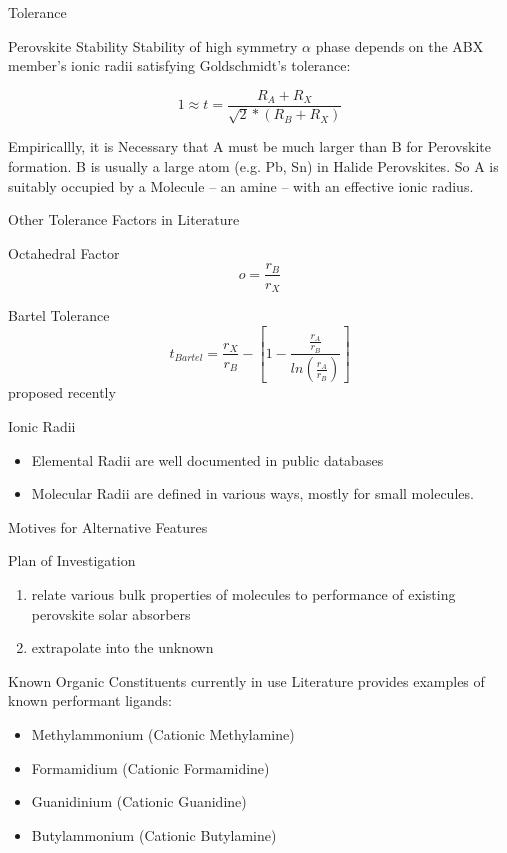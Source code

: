 \documentclass[10pt, aspectratio=169, presentation]{beamer}
\begin{document}
\begin{frame}[label={sec:orgb31e4ee}]{Tolerance}
\begin{block}{Perovskite Stability}
Stability of high symmetry \(\alpha\) phase depends on the ABX member's
ionic radii satisfying Goldschmidt's tolerance:
\autocite{yin-2015-halid-perov}

\[
1 \approx t = \frac{R_A+R_X}{\sqrt{2}*(R_B+R_X)}
\]

Empiricallly, it is \alert{Necessary} that A must be much larger than B
for Perovskite formation. B is usually a large atom (e.g. Pb, Sn) in
Halide Perovskites. So A is suitably occupied by a Molecule -- an
amine -- with an effective ionic radius.
\autocite{kieslich-2015-exten-toler}
\end{block}
\end{frame}
\begin{frame}[label={sec:orgd049ab4}]{Other Tolerance Factors in Literature}
\begin{block}{Octahedral Factor}
\[
o=\frac{r_B}{r_X}
\]
\end{block}
\begin{block}{Bartel Tolerance}
\[
t_{Bartel}=\frac{r_X}{r_B}-[1-\frac{\frac{r_A}{r_B}}{ln(\frac{r_A}{r_B})}]
\]
proposed recently
\autocite{bartel-2019-new-toler}
\end{block}
\begin{block}{Ionic Radii}
\begin{itemize}
\item Elemental Radii are well documented in public databases
\item Molecular Radii are defined in various ways, mostly for small
molecules.
\end{itemize}
\end{block}
\end{frame}
\begin{frame}[label={sec:org4610e6d}]{Motives for Alternative Features}
\begin{block}{Plan of Investigation}
\begin{enumerate}
\item relate various bulk properties of molecules to performance of
existing perovskite solar absorbers
\item extrapolate into the unknown
\end{enumerate}
\end{block}
\begin{block}{Known Organic Constituents currently in use}
Literature provides examples of known performant ligands:
\begin{itemize}
\item Methylammonium (Cationic Methylamine)
\autocite{yan-2016-defec-physic}
\item Formamidium (Cationic Formamidine)
\autocite{dimesso-2016-inves-formam}
\item Guanidinium (Cationic Guanidine)
\autocite{zhang-2019-perov-photov}
\item Butylammonium (Cationic Butylamine)
\autocite{hong-2021-layer-edge}
\end{itemize}
\end{block}
\end{frame}
\end{document}
